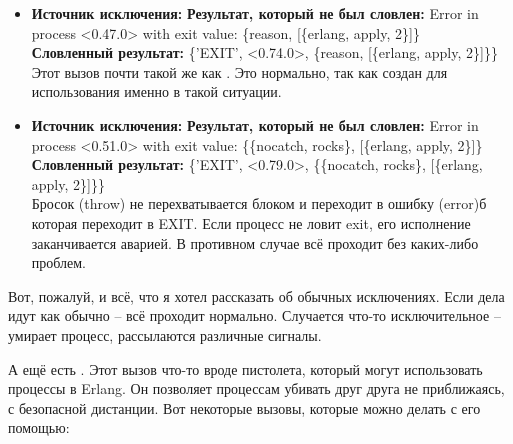 \begin{itemize}
    \item \textbf{Источник исключения:} 
    \textbf{Результат, который не был словлен:} Error in process <0.47.0> with exit value: \{reason, [\{erlang, apply, 2\}]\}\\
    \textbf{Словленный результат:} \{'EXIT', <0.74.0>, \{reason, [\{erlang, apply, 2\}]\}\}\\
    Этот вызов почти такой же как .
    Это нормально, так как  создан для использования именно в такой ситуации.\\
    \item \textbf{Источник исключения:} 
    \textbf{Результат, который не был словлен:} Error in process <0.51.0> with exit value: \{\{nocatch, rocks\}, [\{erlang, apply, 2\}]\}\\
    \textbf{Словленный результат:} \{'EXIT', <0.79.0>, \{\{nocatch, rocks\}, [\{erlang, apply, 2\}]\}\}\\
    Бросок (throw) не перехватывается блоком   и переходит в ошибку (error)б которая переходит в EXIT.
    Если процесс не ловит exit, его исполнение заканчивается аварией.
    В противном случае всё проходит без каких\--либо проблем.
\end{itemize}

Вот, пожалуй, и всё, что я хотел рассказать об обычных исключениях.
Если дела идут как обычно \--- всё проходит нормально.
Случается что\--то исключительное \--- умирает процесс, рассылаются различные сигналы.

А ещё есть .
Этот вызов что\--то вроде пистолета, который могут использовать процессы в Erlang.
Он позволяет процессам убивать друг друга не приближаясь, с безопасной дистанции.
Вот некоторые вызовы, которые можно делать с его помощью:
